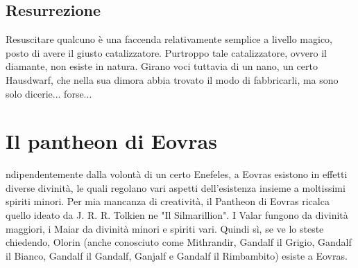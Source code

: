 \subsection{Resurrezione}

Resuscitare qualcuno è una faccenda relativamente semplice a livello magico, posto di avere il giusto catalizzatore. Purtroppo tale catalizzatore, ovvero il diamante, non esiste in natura. Girano voci tuttavia di un nano, un certo Hausdwarf, che nella sua dimora abbia trovato il modo di fabbricarli, ma sono solo dicerie... forse...

\section{Il pantheon di Eovras}

ndipendentemente dalla volontà di un certo Enefeles, a Eovras esistono in effetti diverse divinità, le quali regolano vari aspetti dell'esistenza insieme a moltissimi spiriti minori. Per mia mancanza di creatività, il Pantheon di Eovras ricalca quello ideato da J. R. R. Tolkien ne "Il Silmarillion". I Valar fungono da divinità maggiori, i Maiar da divinità minori e spiriti vari. Quindi sì, se ve lo steste chiedendo, Olorin (anche conosciuto come Mithrandir, Gandalf il Grigio, Gandalf il Bianco, Gandalf il Gandalf, Ganjalf e Gandalf il Rimbambito) esiste a Eovras.